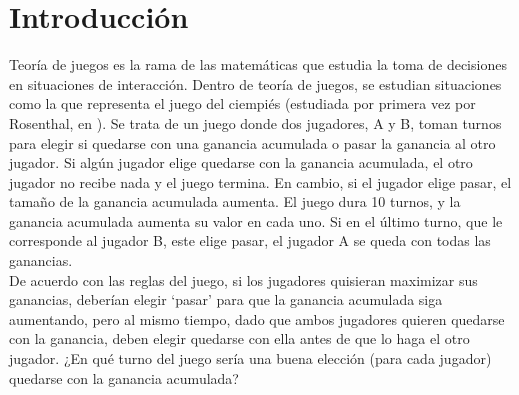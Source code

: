 
\chapter{Introducción} %

\label{Chapter1} %


\newcommand{\keyword}[1]{\textbf{#1}}
\newcommand{\tabhead}[1]{\textbf{#1}}
\newcommand{\code}[1]{\texttt{#1}}
\newcommand{\file}[1]{\texttt{\bfseries#1}}
\newcommand{\option}[1]{\texttt{\itshape#1}}


Teoría de juegos es la rama de las matemáticas que estudia la toma de decisiones en situaciones de interacción. Dentro de teoría de juegos, se estudian situaciones como la que representa el juego del ciempiés (estudiada por primera vez por Rosenthal, en \citeyear{Rosenthal}). Se trata de un juego donde dos jugadores, A y B, toman turnos para elegir si quedarse con una ganancia acumulada o pasar la ganancia al otro jugador. Si algún jugador elige quedarse con la ganancia acumulada, el otro jugador no recibe nada y el juego termina. En cambio, si el jugador elige pasar, el tamaño de la ganancia acumulada aumenta. El juego dura 10 turnos, y la ganancia acumulada aumenta su valor en cada uno. Si en el último turno, que le corresponde al jugador B, este elige pasar, el jugador A se queda con todas las ganancias.\\

De acuerdo con las reglas del juego, si los jugadores quisieran maximizar sus ganancias, deberían elegir ‘pasar’ para que la ganancia acumulada siga aumentando, pero al mismo tiempo, dado que ambos jugadores quieren quedarse con la ganancia, deben elegir quedarse con ella antes de que lo haga el otro jugador. ¿En qué turno del juego sería una buena elección (para cada jugador) quedarse con la ganancia acumulada?\\

